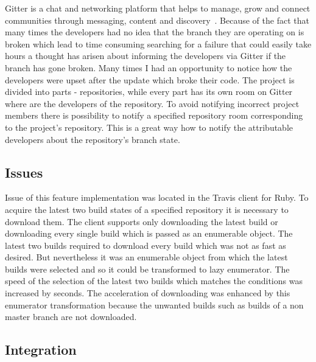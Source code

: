 Gitter is a chat and networking platform that helps to manage, grow and connect communities through messaging, content and discovery~\cite{GITTER}. Because of the fact that many times the developers had no idea that the branch they are operating on is broken which lead to time consuming searching for a failure that could easily take hours a thought has arisen about informing the developers via Gitter if the branch has gone broken. Many times I had an opportunity to notice how the developers were upset after the update which broke their code. The project is divided into parts - repositories, while every part has its own room on Gitter where are the developers of the repository. To avoid notifying incorrect project members there is possibility to notify a specified repository room corresponding to the project's repository. This is a great way how to notify the attributable developers about the repository's branch state.

\subsection{Issues}

Issue of this feature implementation was located in the Travis client for Ruby. To acquire the latest two build states of a specified repository it is necessary to download them. The client supports only downloading the latest build or downloading every single build which is passed as an enumerable object. The latest two builds required to download every build which was not as fast as desired. But nevertheless it was an enumerable object from which the latest builds were selected and so it could be transformed to lazy enumerator. The speed of the selection of the latest two builds which matches the conditions was increased by seconds. The acceleration of downloading was enhanced by this enumerator transformation because the unwanted builds such as builds of a non master branch are not downloaded.

\subsection{Integration}

